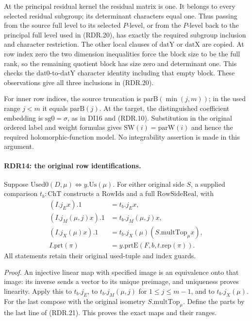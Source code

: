 At the principal residual kernel the residual matrix is one.
It belongs to every selected residual subgroup; its determinant
characters equal one.  Thus passing from the source full
level to its selected \(P\)-level, or from the \(P\)-level
back to the principal full level used in (RDR.20), has exactly
the required subgroup inclusion and character restriction.
The other local clauses of \(\mathrm{datY}\) or \(\mathrm{datX}\)
are copied.  At row index zero the two dimension inequalities
force the block size to be the full rank, so the remaining
quotient block has size zero and determinant one.  This
checks the \(\mathrm{dat0}\)-to-\(\mathrm{datY}\) character
identity including that empty block.  These observations
give all three inclusions in (RDR.20).

For inner row indices, the source truncation is
\(\mathrm{parB}(\min(j,m))\); in the used range \(j<m\)
it equals \(\mathrm{parB}(j)\).  At the target, the
distinguished coefficient embedding is \(\mathrm{sg0}=\sigma\),
as in DI16 and (RDR.10).  Substitution in the original ordered
label and weight formulas gives \(\mathrm{SW}(i)=\mathrm{parW}(i)\)
and hence the required holomorphic-function model.  No
integrability assertion is made in this argument.

\paragraph{RDR14: the original row identifications.}
\label{claim:RDR14}
Suppose \(\mathrm{Used0}(D,\mu)\iff y.\mathrm{Us}(\mu)\).
For either original side \(S\), a supplied comparison
\(t_b:\mathrm{ChT}\) constructs a \(\mathrm{RowIds}\)
and a full \(\mathrm{RowSideReal}\), with
\[
 \begin{split}
 (I.j_E x).1&=t_b.j_E x,\\
 (I.j_M(\mu,j)x).1&=t_b.j_M(\mu,j)x,\\
 (I.j_X(\mu)x).1&=t_b.j_X(\mu)(S.\mathrm{multTop}_\mu x),\\
 I.\mathrm{prt}(\pi)&=y.\mathrm{prtE}(F,b,t.\mathrm{rep}(\pi)).
 \end{split}                                                  \tag{RDR.21}
\]
All statements retain their original used-tuple and index guards.

\emph{Proof.}
An injective linear map with specified image is an equivalence
onto that image: its inverse sends a vector to its unique
preimage, and uniqueness proves linearity.  Apply this to
\(t_b.j_E\), to \(t_b.j_M(\mu,j)\) for
\(1\le j\le m-1\), and to \(t_b.j_X(\mu)\).
For the last compose with the original isometry
\(S.\mathrm{multTop}_\mu\).  Define the parts by the last
line of (RDR.21).  This proves the exact maps and their ranges.

